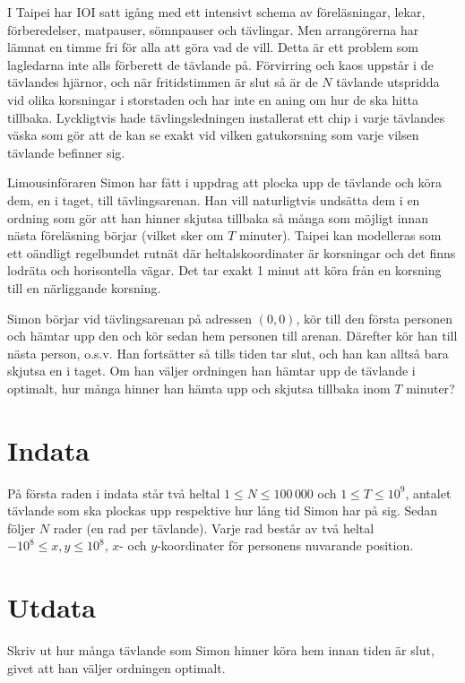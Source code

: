I Taipei har IOI satt igång med ett intensivt schema av föreläsningar, lekar,
förberedelser, matpauser, sömnpauser och tävlingar. Men arrangörerna har lämnat
en timme fri för alla att göra vad de vill. Detta är ett problem som lagledarna
inte alls förberett de tävlande på. Förvirring och kaos uppstår i de tävlandes
hjärnor, och när fritidstimmen är slut så är de $N$ tävlande utspridda vid
olika korsningar i storstaden och har inte en aning om hur de ska hitta
tillbaka. Lyckligtvis hade tävlingsledningen installerat ett chip i varje
tävlandes väska som gör att de kan se exakt vid vilken gatukorsning som varje
vilsen tävlande befinner sig.

Limousinföraren Simon har fått i uppdrag att plocka upp de tävlande och köra
dem, en i taget, till tävlingsarenan. Han vill naturligtvis undsätta dem i en
ordning som gör att han hinner skjutsa tillbaka så många som möjligt innan
nästa föreläsning börjar (vilket sker om $T$ minuter). Taipei kan modelleras
som ett oändligt regelbundet rutnät där heltalskoordinater är korsningar och
det finns lodräta och horisontella vägar. Det tar exakt 1 minut att köra från
en korsning till en närliggande korsning.

Simon börjar vid tävlingsarenan på adressen $(0, 0)$, kör till den första
personen och hämtar upp den och kör sedan hem personen till arenan. Därefter
kör han till nästa person, o.s.v. Han fortsätter så tills tiden tar slut, och
han kan alltså bara skjutsa en i taget. Om han väljer ordningen han hämtar upp
de tävlande i optimalt, hur många hinner han hämta upp och skjutsa tillbaka
inom $T$ minuter?

\section*{Indata}
På första raden i indata står två heltal $1 \leq N \leq 100\,000$ och $1 \leq T
\leq 10^9$, antalet tävlande som ska plockas upp respektive hur lång tid Simon
har på sig. Sedan följer $N$ rader (en rad per tävlande). Varje rad består av
två heltal $-10^8 \leq x, y \leq 10^8$, $x$- och $y$-koordinater för personens
nuvarande position.

\section*{Utdata}
Skriv ut hur många tävlande som Simon hinner köra hem innan tiden är slut,
givet att han väljer ordningen optimalt.

